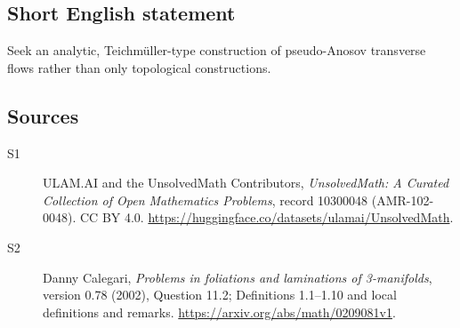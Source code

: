 \documentclass[11pt]{article}
\begin{document}
\subsection{Short English statement}
Seek an analytic, Teichmüller-type construction of pseudo-Anosov transverse flows rather than only topological constructions.
\subsection{Sources}
\begin{description}
\item[\hypertarget{source:10300048:1}{S1}] ULAM.AI and the UnsolvedMath Contributors, \emph{UnsolvedMath: A Curated Collection of Open Mathematics Problems}, record 10300048 (AMR-102-0048). CC BY 4.0. \url{https://huggingface.co/datasets/ulamai/UnsolvedMath}.
\item[\hypertarget{source:10300048:2}{S2}] Danny Calegari, \emph{Problems in foliations and laminations of 3-manifolds}, version 0.78 (2002), Question 11.2; Definitions 1.1--1.10 and local definitions and remarks. \url{https://arxiv.org/abs/math/0209081v1}.
\end{description}
\label{end:10300048}
\end{document}
